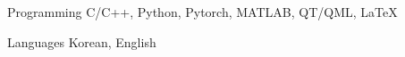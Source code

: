

\begin{cvskills}

  \cvskill
    {Programming} %
    {C/C++, Python, Pytorch, MATLAB, QT/QML, LaTeX} %

  \cvskill
    {Languages} %
    {Korean, English} %

\end{cvskills}

